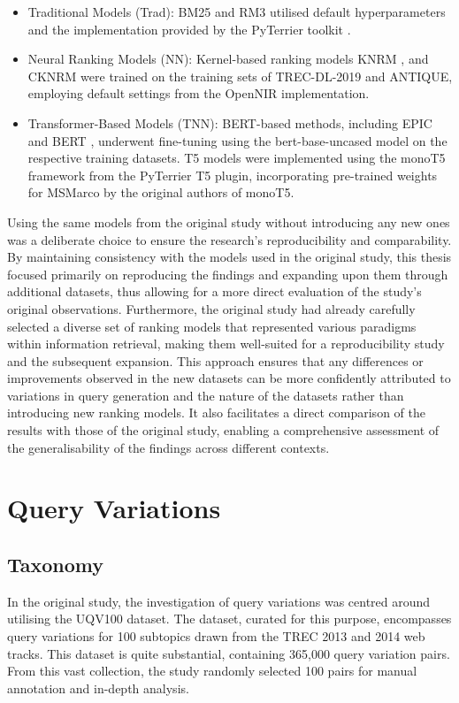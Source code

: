 \begin{itemize}
    \item Traditional Models (Trad): BM25 \cite{bm25} and RM3 \cite{rm3} utilised default hyperparameters and the implementation provided by the PyTerrier toolkit \cite{pyterrier}.
    \item Neural Ranking Models (NN): Kernel-based ranking models KNRM \cite{knrm}, and CKNRM \cite{cknrm} were trained on the training sets of TREC-DL-2019 and ANTIQUE, employing default settings from the OpenNIR \cite{opennir} implementation.
    \item Transformer-Based Models (TNN): BERT-based methods, including EPIC \cite{epic} and BERT \cite{bert}, underwent fine-tuning using the bert-base-uncased model on the respective training datasets. T5 \cite{t5} models were implemented using the monoT5 \cite{monot5} framework from the PyTerrier T5 plugin, incorporating pre-trained weights for MSMarco \cite{msmarco} by the original authors of monoT5.
\end{itemize}

Using the same models from the original study without introducing any new ones was a deliberate choice to ensure the research's reproducibility and comparability. By maintaining consistency with the models used in the original study, this thesis focused primarily on reproducing the findings and expanding upon them through additional datasets, thus allowing for a more direct evaluation of the study's original observations. Furthermore, the original study had already carefully selected a diverse set of ranking models that represented various paradigms within information retrieval, making them well-suited for a reproducibility study and the subsequent expansion. This approach ensures that any differences or improvements observed in the new datasets can be more confidently attributed to variations in query generation and the nature of the datasets rather than introducing new ranking models. It also facilitates a direct comparison of the results with those of the original study, enabling a comprehensive assessment of the generalisability of the findings across different contexts.

\section{Query Variations}
\subsection{Taxonomy}
In the original study, the investigation of query variations was centred around utilising the UQV100 \cite{uqv} dataset. The dataset, curated for this purpose, encompasses query variations for 100 subtopics drawn from the TREC 2013 and 2014 web tracks. This dataset is quite substantial, containing 365,000 query variation pairs. From this vast collection, the study randomly selected 100 pairs for manual annotation and in-depth analysis.

